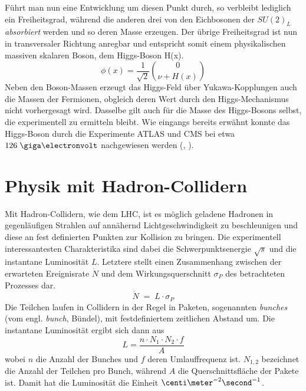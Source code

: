 Führt man nun eine Entwicklung um diesen Punkt durch, so verbleibt lediglich
ein Freiheitsgrad, während die anderen drei von den Eichbosonen der $SU(2)_L$
\textit{absorbiert} werden und so deren Masse erzeugen. Der übrige
Freiheitsgrad ist nun in transversaler Richtung anregbar und entspricht somit
einem physikalischen massiven skalaren Boson, dem Higgs-Boson H(x).
\begin{equation}
    \phi(x) = \frac{1}{\sqrt{2}}\binom{0}{\nu+H(x)}
\end{equation}
Neben den Boson-Massen erzeugt das Higgs-Feld über Yukawa-Kopplungen auch die
Massen der Fermionen, obgleich deren Wert durch den Higgs-Mechanismus nicht
vorhergesagt wird. Dasselbe gilt auch für die Masse des Higgs-Bosons selbst,
die experimentell zu ermitteln bleibt. Wie eingangs bereits erwähnt konnte das
Higgs-Boson durch die Experimente ATLAS und CMS bei etwa $126\GeV$ nachgewiesen
werden (\cite{Aad:2012tfa}, \cite{Chatrchyan:2013lba}).



\section{Physik mit Hadron-Collidern}
\label{theory:hadron_collider}


Mit Hadron-Collidern, wie dem \ac{LHC}, ist es möglich geladene Hadronen in
gegenläufigen Strahlen auf annähernd Lichtgeschwindigkeit zu beschleunigen und
diese an fest definierten Punkten zur Kollision zu bringen. Die experimentell
interessantesten Charakteristika sind dabei die Schwerpunktsenergie $\sqrt{s}$
und die instantane Luminosität $L$. Letztere stellt einen Zusammenhang zwischen
der erwarteten Ereignisrate $\dot N$ und dem Wirkungsquerschnitt $\sigma_P$ des
betrachteten Prozesses dar.
\begin{equation}
    \dot N \;=\; L \cdot \sigma_P
\end{equation}
Die Teilchen laufen in Collidern in der Regel in Paketen, sogenannten
\textit{bunches} (vom engl. \textit{bunch}, Bündel), mit festdefiniertem
zeitlichen Abstand um. Die instantane Luminosität ergibt sich dann aus
\begin{equation}
    L = \frac{n \cdot N_1 \cdot  N_2 \cdot f}{A}
    \label{eq:collider_lumi}
\end{equation}
wobei $n$ die Anzahl der Bunches und $f$ deren Umlauffrequenz ist. $N_{1,2}$
bezeichnet die Anzahl der Teilchen pro Bunch, während $A$ die
Querschnittsfläche der Pakete ist. Damit hat die Luminosität die Einheit
$\centi\meter^{-2}\second^{-1}$.

